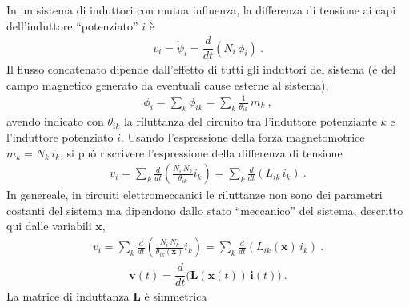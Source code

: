 \documentclass[letterpaper,10pt,english]{jupyterBook}
\begin{document}
\sphinxAtStartPar
In un sistema di induttori con mutua influenza, la differenza di tensione ai capi dell’induttore “potenziato” \(i\) è
\begin{equation*}
\begin{split}v_i = \dot{\psi}_i = \dfrac{d}{dt} \left( N_i \, \phi_i \right) \ .\end{split}
\end{equation*}
\sphinxAtStartPar
Il flusso concatenato dipende dall’effetto di tutti gli induttori del sistema (e del campo magnetico generato da eventuali cause esterne al sistema),
\begin{equation*}
\begin{split}\phi_i = \sum_{k} \phi_{ik} = \sum_{k} \frac{1}{\theta_{ik}} \, m_k \ ,\end{split}
\end{equation*}
\sphinxAtStartPar
avendo indicato con \(\theta_{ik}\) la riluttanza del circuito tra l’induttore potenziante \(k\) e l’induttore potenziato \(i\). Usando l’espressione della forza magneto\sphinxhyphen{}motrice \(m_k = N_k \, i_k\), si può riscrivere l’espressione della differenza di tensione
\begin{equation*}
\begin{split}v_i = \sum_k \frac{d}{dt} \left( \frac{N_i \, N_k}{\theta_{ik}} i_k \right) = \sum_k \frac{d}{dt} \left( L_{ik} \, i_k \right) \ .\end{split}
\end{equation*}
\sphinxAtStartPar
In genereale, in circuiti elettromeccanici le riluttanze non sono dei parametri costanti del sistema ma dipendono dallo stato “meccanico” del sistema, descritto qui dalle variabili \(\mathbf{x}\),
\begin{equation*}
\begin{split}v_i = \sum_k \frac{d}{dt} \left( \frac{N_i \, N_k}{\theta_{ik}(\mathbf{x})} i_k \right) = \sum_k \frac{d}{dt} \left( L_{ik} (\mathbf{x}) \, i_k \right) \ .\end{split}
\end{equation*}\begin{equation*}
\begin{split}\mathbf{v}(t) = \dfrac{d}{dt} \Big( \mathbf{L}(\mathbf{x}(t)) \, \mathbf{i}(t) \Big) \ .\end{split}
\end{equation*}
\sphinxAtStartPar
La matrice di induttanza \(\mathbf{L}\) è simmetrica  
\end{document}
